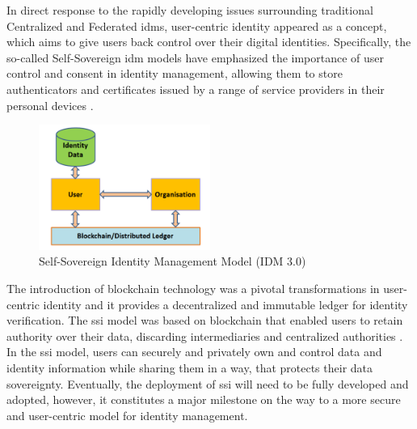 In direct response to the rapidly developing issues surrounding traditional Centralized and Federated \gls{idm}s, user-centric identity appeared as a concept, which 
aims to give users back control over their digital identities. Specifically, the so-called Self-Sovereign \gls{idm} models have emphasized the importance of user 
control and consent in identity management, allowing them to store authenticators and certificates issued by a range of service providers in their personal 
devices \cite{9881610}.

\begin{figure}[h]  
  \centering
  \includegraphics[width=0.5\textwidth]{Images/c3_4.png} 
  \caption{Self-Sovereign Identity Management Model (IDM 3.0)}
\end{figure}

The introduction of blockchain technology was a pivotal transformations in user-centric identity and it provides a decentralized and immutable ledger for identity 
verification. The \gls{ssi} model was based on blockchain that enabled users to retain authority over their data, discarding intermediaries and centralized authorities 
\cite{9881610}. In the \gls{ssi} model, users can securely and privately own and control data and identity information while sharing them in a way, that protects 
their data sovereignty. Eventually, the deployment of \gls{ssi} will need to be fully developed and adopted, however, it constitutes a major milestone on the way to a more 
secure and user-centric model for identity management.
